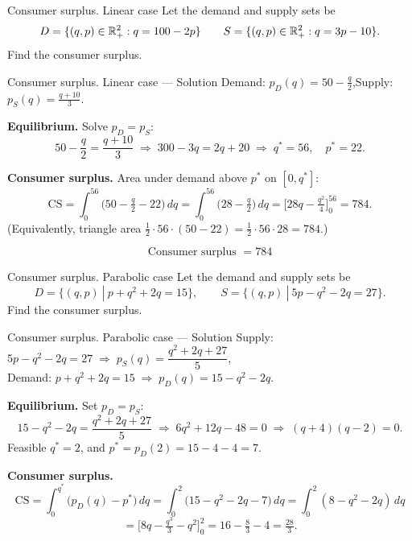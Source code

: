 \documentclass[9pt]{beamer}
\begin{document}
\begin{frame}{Consumer surplus. Linear case}
    Let the demand and supply sets be
    \[
    D= \{(q,p)\in\mathbb{R}_+^2: q=100-2p\}
    \qquad
    S= \{(q,p)\in\mathbb{R}_+^2: q=3p-10\}.
    \]
    Find the consumer surplus.
\end{frame}

\begin{frame}{Consumer surplus. Linear case — Solution}
    \small
    Demand: $p_D(q)=50-\tfrac{q}{2}$,\quad Supply: $p_S(q)=\tfrac{q+10}{3}$.
    
    \textbf{Equilibrium.} Solve $p_D=p_S$:
    \[
    50-\frac{q}{2}=\frac{q+10}{3}\;\Rightarrow\; 300-3q=2q+20 \;\Rightarrow\; q^*=56,\quad
    p^*=22.
    \]
    
    \textbf{Consumer surplus.} Area under demand above $p^*$ on $[0,q^*]$:
    \[
    \text{CS}=\int_{0}^{56}\!\big(50-\tfrac{q}{2}-22\big)\,dq
    =\int_{0}^{56}\!\big(28-\tfrac{q}{2}\big)\,dq
    =\Big[28q-\tfrac{q^{2}}{4}\Big]_{0}^{56}
    =784.
    \]
    (Equivalently, triangle area $\tfrac{1}{2}\cdot 56\cdot(50-22)=\tfrac{1}{2}\cdot56\cdot28=784$.)
    
    \[
    \boxed{\text{Consumer surplus }=784}
    \]
\end{frame}

\begin{frame}{Consumer surplus. Parabolic case}
    Let the demand and supply sets be
    $$
    D= \{(q,p)\ |\ p + q^2 +2q = 15\},\qquad S = \{(q,p)\ |\ 5p- q^2 -2q = 27\}.
    $$
    Find the consumer surplus.
\end{frame}

\begin{frame}{Consumer surplus. Parabolic case — Solution}
    \small
    Supply: $5p-q^2-2q=27 \;\Rightarrow\; p_S(q)=\dfrac{q^2+2q+27}{5}$, \\
    Demand: $p+q^2+2q=15 \;\Rightarrow\; p_D(q)=15-q^2-2q$.
    
    \textbf{Equilibrium.} Set $p_D=p_S$:
    \[
    15-q^2-2q=\frac{q^2+2q+27}{5}
    \;\Rightarrow\; 6q^2+12q-48=0
    \;\Rightarrow\; (q+4)(q-2)=0.
    \]
    Feasible $q^*=2$, and $p^*=p_D(2)=15-4-4=7$.
    
    \textbf{Consumer surplus.}
    \[
    \text{CS}=\int_{0}^{q^*}\!\big(p_D(q)-p^*\big)\,dq
    =\int_{0}^{2}\!\big(15-q^2-2q-7\big)\,dq
    =\int_{0}^{2}\!(8-q^2-2q)\,dq
    \]
    \[
    =\Big[8q-\tfrac{q^3}{3}-q^2\Big]_{0}^{2}
    =16-\tfrac{8}{3}-4
    =\boxed{\tfrac{28}{3}}.
    \]
\end{frame}
\end{document}
